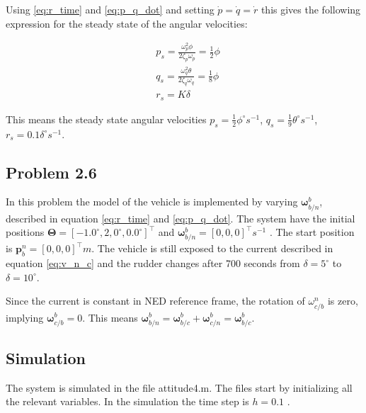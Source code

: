 Using \eqref{eq:r_time} and \eqref{eq:p_q_dot} and setting $\dot{p} =\dot{q} = \dot{r}$ this gives the following expression for the steady state of the angular  velocities:

\begin{equation}
\begin{aligned}
	& p_s = \frac{\omega_p^2 \phi}{ 2\zeta_p\omega_p} = \frac{1}{2} \phi \\
	& q_s = \frac{\omega_q^2 \theta}{2\zeta_q\omega_q} = \frac{1}{8} \phi \\
	& r_s = K \delta
	\label{eq:p_q_dot}
\end{aligned}
\end{equation}

This means the steady state angular velocities $p_s = \frac{1}{2} \phi ^\circ s^{-1}$, $q_s = \frac{1}{9} \theta ^\circ s^{-1}$, $r_s = 0.1 \delta ^\circ s^{-1}$. 

\subsection*{Problem 2.6}

In this problem the model of the vehicle is implemented by varying $\boldsymbol{\omega}^b_{b/n}$, described in equation \eqref{eq:r_time} and \eqref{eq:p_q_dot}. The system have the initial positions $\boldsymbol{\Theta} = [-1.0^\circ, 2,0^\circ, 0.0^\circ]^\top$ and $\boldsymbol{\omega}^b_{b/n} = [0,0,0]^\top s^{-1}$ . The start position is $\mathbf{p}^n_{b} = [0,0,0]^\top m$. The vehicle is still exposed to the current described in equation \eqref{eq:v_n_c}  and the rudder changes after 700 seconds from $\delta = 5^\circ$ to $\delta = 10^\circ$.

Since the current is constant in NED reference frame, the rotation of $\omega^n_{c/b} $ is zero, implying $\boldsymbol{\omega}^b_{c/b} = 0$. This means $ \boldsymbol{\omega}^b_{b/n} = \boldsymbol{\omega}^b_{b/c} + \boldsymbol{\omega}^b_{c/n}  = \boldsymbol{\omega}^b_{b/c} $. 

\subsection*{Simulation}

The system is simulated in the file {\color{blue} attitude4.m}. The files start by initializing all the relevant variables. In the simulation the time step is $h = 0.1$ .

